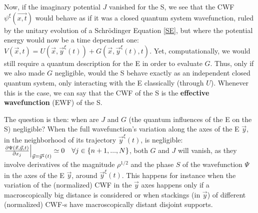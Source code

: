 \documentclass[11pt, a4paper]{article} %
\begin{document}


Now, if the imaginary potential $J$ vanished for the S, we see that the CWF $\psi^\xi(\vec{x,t})$ would behave as if it was a closed quantum system wavefunction, ruled by the unitary evolution of a Schrödinger Equation \eqref{SE}, but where the potential energy would now be a time dependent one: $V(\vec{x},t)=U(\vec{x},\vec{y}^\xi(t))+G(\vec{x},\vec{y}^\xi(t),t)$. Yet, computationally, we would still require a quantum description for the E in order to evaluate $G$. Thus, only if we also made $G$ negligible, would the S behave exactly as an independent closed quantum system, only interacting with the E classically (through $U$). Whenever this is the case, we can say that the CWF of the S is the {\bf effective wavefunction} (EWF) of the S. 

The question is then: when are $J$ and $G$ (the quantum influences of the E on the S) negligible? When the full wavefunction's variation along the axes of the E $\vec{y}$, in the neighborhood of its trajectory $\vec{y}^\xi(t)$, is negligible: $\pdv{\Psi(\vec{x},\vec{y},t)}{x_j}\Big\rvert_{\vec{y}=\vec{y}^\xi(t)}\simeq 0  \quad \forall j\in\{n+1,...,N\}$, both $G$ and $J$ will vanish, as they involve derivatives of the magnitude $\rho^{1/2}$ and the phase $S$ of the wavefunction $\Psi$ in the axes of the E $\vec{y}$, around $\vec{y}^\xi(t)$. This happens for instance when the variation of the (normalized) CWF in the $\vec{y}
$ axes happens only if a macroscopically big distance is considered or when stackings (in $\vec{y}$) of different (normalized) CWF-s have macroscopically distant disjoint supports.
\end{document}
